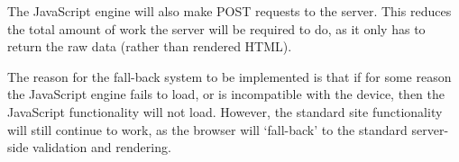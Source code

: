 The JavaScript engine will also make POST requests to the server. This reduces 
the total amount of work the server will be required to do, as it only has to 
return the raw data (rather than rendered HTML).

The reason for the fall-back system to be implemented is that if for some reason
the JavaScript engine fails to load, or is incompatible with the device, then 
the JavaScript functionality will not load. However, the standard site 
functionality will still continue to work, as the browser will `fall-back' to 
the standard server-side validation and rendering.

